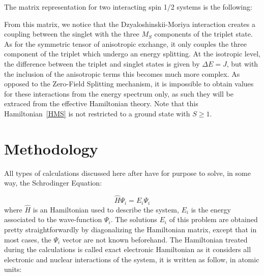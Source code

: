 \documentclass[12pt]{report}
\numberwithin{equation}{section}
\begin{document}
The matrix representation for two interacting spin 1/2 systems is the following:
\begin{center}
    \centering
\end{center}
From this matrix, we notice that the Dzyaloshinskii-Moriya interaction creates a coupling between the singlet with the three $M_S$ components of the triplet state.
As for the symmetric tensor of anisotropic exchange, it only couples the three component of the triplet which undergo an energy splitting.
At the isotropic level, the difference between the triplet and singlet states is given by $\Delta E=J$, but with the inclusion of the anisotropic terms this becomes much more complex. 
As opposed to the Zero-Field Splitting mechanism, it is impossible to obtain values for these interactions from the energy spectrum only, as such they will be extraced from the effective Hamiltonian theory.
Note that this Hamiltonian~\ref{HMS} is not restricted to a ground state with $S\ge1$.

\section{Methodology}

All types of calculations discussed here after have for purpose to solve, in some way, the Schrodinger Equation:

\begin{equation}
    \hat{H}\Psi_i=E_i\Psi_i
\end{equation}
where $\hat{H}$ is an Hamiltonian used to describe the system, $E_i$ is the energy associated to the wave-function $\Psi_i$. 
The solutions $E_i$ of this problem are obtained pretty straightforwardly by diagonalizing the Hamiltonian matrix, except that in most cases, the $\Psi_i$ vector are not known beforehand.
The Hamiltonian treated during the calculations is called exact electronic Hamiltonian as it considers all electronic and nuclear interactions of the system, it is written as follow, in atomic units:
\end{document}
